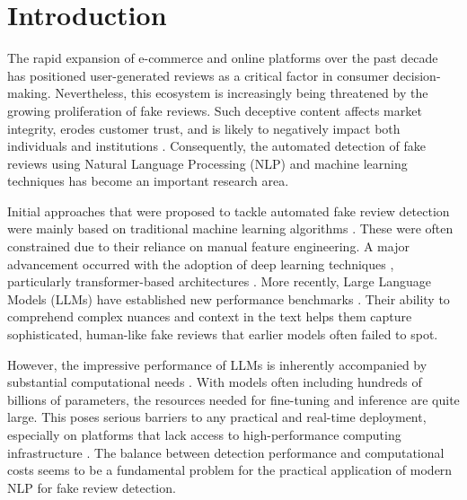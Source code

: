 \documentclass[utf8]{FrontiersinHarvard}
\begin{document}

\section{Introduction}

The rapid expansion of e-commerce and online platforms over the past decade has positioned user-generated reviews as a critical factor in consumer decision-making. Nevertheless, this ecosystem is increasingly being threatened by the growing proliferation of fake reviews. Such deceptive content affects market integrity, erodes customer trust, and is likely to negatively impact both individuals and institutions \citep{Cao2023}. Consequently, the automated detection of fake reviews using Natural Language Processing (NLP) and machine learning techniques has become an important research area.

Initial approaches that were proposed to tackle automated fake review detection were mainly based on traditional machine learning algorithms \citep{PatelAnand2025}. These were often constrained due to their reliance on manual feature engineering. A major advancement occurred with the adoption of deep learning techniques \citep{WangZhenhua2025}, particularly transformer-based architectures \citep{Alsaad2024}. More recently, Large Language Models (LLMs) have established new performance benchmarks \citep{WangZhenhua2026}. Their ability to comprehend complex nuances and context in the text helps them capture sophisticated, human-like fake reviews that earlier models often failed to spot.

However, the impressive performance of LLMs is inherently accompanied by substantial computational needs \citep{Refaeli2021, Zabeen2023}. With models often including hundreds of billions of parameters, the resources needed for fine-tuning and inference are quite large. This poses serious barriers to any practical and real-time deployment, especially on platforms that lack access to high-performance computing infrastructure \citep{Gambetti2023}. The balance between detection performance and computational costs seems to be a fundamental problem for the practical application of modern NLP for fake review detection.
\end{document}
